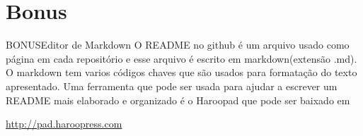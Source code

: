\documentclass[10pt]{beamer}
\begin{document}

%

{\aauwavesbg%
\begin{frame}%
\end{frame}}

\section*{Bonus}
\begin{frame}{BONUS}{Editor de Markdown}
O README no github é um arquivo usado como página em cada repositório e esse arquivo é escrito em markdown(extensão .md).\\
O markdown tem varios códigos chaves que são usados para formatação do texto apresentado. Uma ferramenta que pode ser usada para ajudar a escrever um README mais elaborado e organizado é o Haroopad que pode ser baixado em\\ \begin{center}
\url{http://pad.haroopress.com}
\end{center}
\end{frame}
\end{document}
